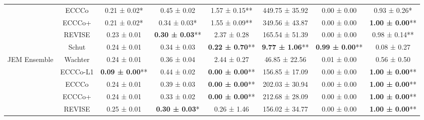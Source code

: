 \begin{table}
{\begin{tabular}[t]{cccccccc}
 & ECCCo & 0.21 ± 0.02*\hphantom{*} & 0.45 ± 0.02\hphantom{*}\hphantom{*} & 1.57 ± 0.15** & 449.75 ± 35.92\hphantom{*}\hphantom{*} & 0.00 ± 0.00\hphantom{*}\hphantom{*} & 0.93 ± 0.26*\hphantom{*}\\

 & ECCCo+ & 0.21 ± 0.02*\hphantom{*} & 0.34 ± 0.03*\hphantom{*} & 1.55 ± 0.09** & 349.56 ± 43.87\hphantom{*}\hphantom{*} & 0.00 ± 0.00\hphantom{*}\hphantom{*} & \textbf{1.00 ± 0.00}**\\

 & REVISE & 0.23 ± 0.01\hphantom{*}\hphantom{*} & \textbf{0.30 ± 0.03}** & 2.37 ± 0.28\hphantom{*}\hphantom{*} & 165.54 ± 51.39\hphantom{*}\hphantom{*} & 0.00 ± 0.00\hphantom{*}\hphantom{*} & 0.98 ± 0.14**\\

 & Schut & 0.24 ± 0.01\hphantom{*}\hphantom{*} & 0.34 ± 0.03\hphantom{*}\hphantom{*} & \textbf{0.22 ± 0.70}** & \textbf{9.77 ± 1.06}** & \textbf{0.99 ± 0.00}** & 0.08 ± 0.27\hphantom{*}\hphantom{*}\\

\multirow[t]{-6}{*}{\centering\arraybackslash JEM Ensemble} & Wachter & 0.24 ± 0.01\hphantom{*}\hphantom{*} & 0.36 ± 0.04\hphantom{*}\hphantom{*} & 2.44 ± 0.27\hphantom{*}\hphantom{*} & 46.85 ± 22.56\hphantom{*}\hphantom{*} & 0.01 ± 0.00\hphantom{*}\hphantom{*} & 0.56 ± 0.50\hphantom{*}\hphantom{*}\\
\cmidrule{1-8}
 & ECCCo-L1 & \textbf{0.09 ± 0.00}** & 0.44 ± 0.02\hphantom{*}\hphantom{*} & \textbf{0.00 ± 0.00}** & 156.85 ± 17.09\hphantom{*}\hphantom{*} & 0.00 ± 0.00\hphantom{*}\hphantom{*} & \textbf{1.00 ± 0.00}**\\

 & ECCCo & 0.24 ± 0.01\hphantom{*}\hphantom{*} & 0.39 ± 0.03\hphantom{*}\hphantom{*} & \textbf{0.00 ± 0.00}** & 202.03 ± 30.94\hphantom{*}\hphantom{*} & 0.00 ± 0.00\hphantom{*}\hphantom{*} & \textbf{1.00 ± 0.00}**\\

 & ECCCo+ & 0.24 ± 0.01\hphantom{*}\hphantom{*} & 0.33 ± 0.02\hphantom{*}\hphantom{*} & \textbf{0.00 ± 0.00}** & 212.68 ± 28.09\hphantom{*}\hphantom{*} & 0.00 ± 0.00\hphantom{*}\hphantom{*} & \textbf{1.00 ± 0.00}**\\

 & REVISE & 0.25 ± 0.01\hphantom{*}\hphantom{*} & \textbf{0.30 ± 0.03}*\hphantom{*} & 0.26 ± 1.46\hphantom{*}\hphantom{*} & 156.02 ± 34.77\hphantom{*}\hphantom{*} & 0.00 ± 0.00\hphantom{*}\hphantom{*} & \textbf{1.00 ± 0.00}**\\


\end{tabular}}
\end{table}
